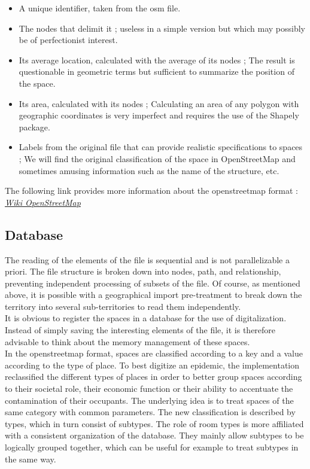 \begin{itemize}
\item A unique identifier, taken from the osm file.
\item The nodes that delimit it ; useless in a simple version but which may possibly be of perfectionist interest.
\item Its average location, calculated with the average of its nodes ; The result is questionable in geometric terms but sufficient to summarize the position of the space.
\item Its area, calculated with its nodes ; Calculating an area of any polygon with geographic coordinates is very imperfect and requires the use of the Shapely package.
\item Labels from the original file that can provide realistic specifications to spaces ; We will find the original classification of the space in OpenStreetMap and sometimes amusing information such as the name of the structure, etc.\\
\end{itemize}


The following link provides more information about the openstreetmap format : \href{https://wiki.openstreetmap.org/wiki/FR:\%C3\%89l\%C3\%A9ments\_cartographiques}{\textit{Wiki OpenStreetMap}}\\

\subsection{Database}

The reading of the elements of the file is sequential and is not parallelizable a priori. The file structure is broken down into nodes, path, and relationship, preventing independent processing of subsets of the file. Of course, as mentioned above, it is possible with a geographical import pre-treatment to break down the territory into several sub-territories to read them independently.\\

It is obvious to register the spaces in a database for the use of digitalization. Instead of simply saving the interesting elements of the file, it is therefore advisable to think about the memory management of these spaces.\\

In the openstreetmap format, spaces are classified according to a key and a value according to the type of place. To best digitize an epidemic, the implementation reclassified the different types of places in order to better group spaces according to their societal role, their economic function or their ability to accentuate the contamination of their occupants. The underlying idea is to treat spaces of the same category with common parameters. The new classification is described by types, which in turn consist of subtypes. The role of room types is more affiliated with a consistent organization of the database. They mainly allow subtypes to be logically grouped together, which can be useful for example to treat subtypes in the same way.\\

